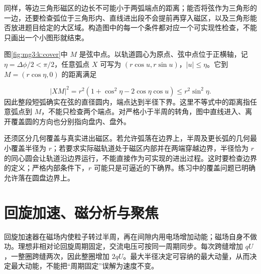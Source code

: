 同样，等边三角形磁区的边长不可能小于两弧端点的距离；能否将弦作为三角形的一边，还要检查弧位于三角形内、直线进出段不会提前再穿入磁区，以及三角形能否放进题目给定的大区域。构造图中的每一个条件都对应一个可实现性检查，不能只画出一个小图形就结束。

图\ref{fig:mg3:k:cover}中 $M$ 是弦中点。以轨道圆心为原点、弦中点位于正横轴，记 $\eta=\Delta\phi/2<\pi/2$，任意弧点 $X$ 可写为 $(r\cos u,r\sin u)$，$|u|\le\eta$。它到 $M=(r\cos\eta,0)$ 的距离满足

\[
 |XM|^2=r^2(1+\cos^2\eta-2\cos\eta\cos u)
 \le r^2\sin^2\eta.
\]
因此整段短弧确实在弦的直径圆内，端点达到半径下界。这里不等式中的距离指任意弧点到 $M$，不能只检查两个端点。对严格小于半周的转角，图中直线进入、离开覆盖圆的方向也分别指向盘内、盘外。


还须区分几何覆盖与真实进出磁区。若允许弧落在边界上，半周及更长弧的几何最小覆盖半径为 $r$；若要求实际磁轨道处于磁区内部并在两端穿越边界，半径恰为 $r$ 的同心圆会让轨道沿边界运行，不能直接作为可实现的进出过程。这时要检查边界的定义；严格内部条件下，$r$ 可能只是可逼近的下确界。练习中的覆盖问题已明确允许落在圆盘边界上。



\section{回旋加速、磁分析与聚焦}
回旋加速器在磁场内使粒子转过半周，再在间隙内用电场增加动能；磁场自身不做功。理想非相对论回旋周期固定，交流电压可按同一周期同步。每次跨缝增加 $qU$，一整圈跨缝两次，因此整圈增加 $2qU$。最大半径决定可容纳的最大动量，从而决定最大动能，不能把“周期固定”误解为速度不变。



